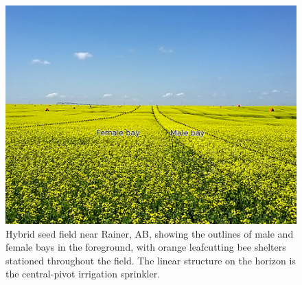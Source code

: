 \documentclass[12pt]{article} %
\begin{document}
\begin{figure}[h]
    \centering
    \includegraphics[width=\textwidth,keepaspectratio=true]{seedfieldBays.jpg}
    \caption[Hybrid seed field production field near Rainer, AB]{Hybrid seed field near Rainer, AB, showing the outlines of male and female bays in the foreground, with orange leafcutting bee shelters stationed throughout the field. The linear structure on the horizon is the central-pivot irrigation sprinkler.}
\end{figure}
\end{document}
